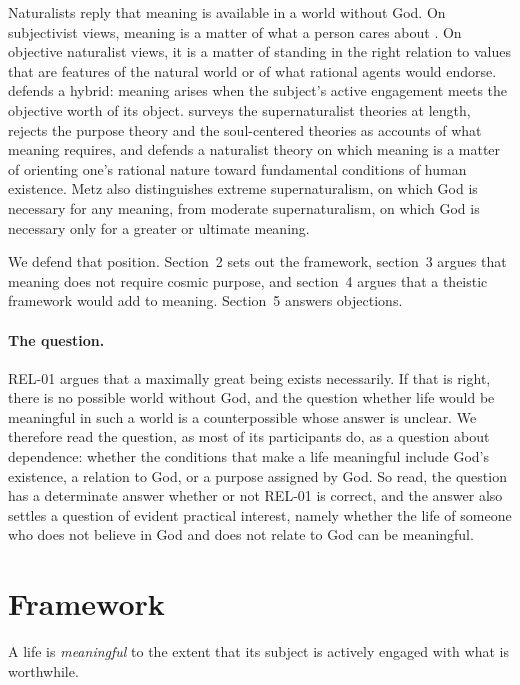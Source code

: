 \documentclass{situationist-preprint}
\begin{document}
Naturalists reply that meaning is available in a world without God. On subjectivist views, meaning is a matter of what a person cares about \citep{Taylor1970}. On objective naturalist views, it is a matter of standing in the right relation to values that are features of the natural world or of what rational agents would endorse. \citet{Wolf2010} defends a hybrid: meaning arises when the subject's active engagement meets the objective worth of its object. \citet{Metz2013} surveys the supernaturalist theories at length, rejects the purpose theory and the soul-centered theories as accounts of what meaning requires, and defends a naturalist theory on which meaning is a matter of orienting one's rational nature toward fundamental conditions of human existence. Metz also distinguishes extreme supernaturalism, on which God is necessary for any meaning, from moderate supernaturalism, on which God is necessary only for a greater or ultimate meaning.

We defend that position. Section~2 sets out the framework, section~3 argues that meaning does not require cosmic purpose, and section~4 argues that a theistic framework would add to meaning. Section~5 answers objections.

\paragraph{The question.} REL-01 argues that a maximally great being exists necessarily. If that is right, there is no possible world without God, and the question whether life would be meaningful in such a world is a counterpossible whose answer is unclear. We therefore read the question, as most of its participants do, as a question about dependence: whether the conditions that make a life meaningful include God's existence, a relation to God, or a purpose assigned by God. So read, the question has a determinate answer whether or not REL-01 is correct, and the answer also settles a question of evident practical interest, namely whether the life of someone who does not believe in God and does not relate to God can be meaningful.

\section{Framework}

\begin{definition}[Meaning]\label{d:meaning}
A life is \emph{meaningful} to the extent that its subject is actively engaged with what is worthwhile.
\end{definition}
\end{document}

